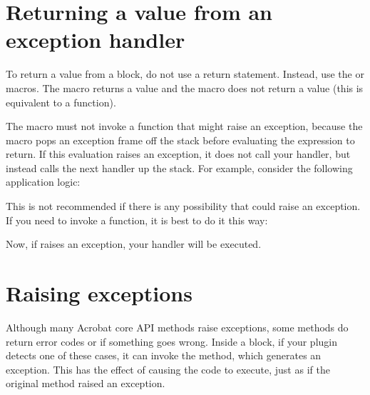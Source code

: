 \documentclass[letterpaper,12pt,english,openany,oneside]{sphinxmanual}
\begin{document}
\section{Returning a value from an exception handler}
\label{\detokenize{Plugins_Exceptions:returning-a-value-from-an-exception-handler}}
To return a value from a   block, do not use a return statement. Instead, use the  or  macros. The  macro returns a value and the  macro does not return a value (this is equivalent to a  function).

The  macro must not invoke a function that might raise an exception, because the macro pops an exception frame off the stack before evaluating the expression to return. If this evaluation raises an exception, it does not call your handler, but instead calls the next handler up the stack. For example, consider the following application logic:

\begin{sphinxVerbatim}[commandchars=\\\{\}]
\end{sphinxVerbatim}

This is not recommended if there is any possibility that  could raise an exception. If you need to invoke a function, it is best to do it this way:

\begin{sphinxVerbatim}[commandchars=\\\{\}]
  

\end{sphinxVerbatim}

Now, if  raises an exception, your handler will be executed.


\section{Raising exceptions}
\label{\detokenize{Plugins_Exceptions:raising-exceptions}}
Although many Acrobat core API methods raise exceptions, some methods do return error codes or  if something goes wrong. Inside a  block, if your plugin detects one of these cases, it can invoke the  method, which generates an exception. This has the effect of causing the  code to execute, just as if the original method raised an exception.
\end{document}

